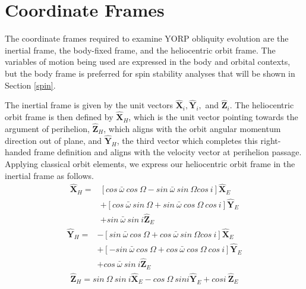 \documentclass[12pt,notitlepage]{article}
\begin{document}
\section{Coordinate Frames}\label{coord}

The coordinate frames required to examine YORP obliquity evolution are the inertial frame, the body-fixed frame, and the heliocentric orbit frame. The variables of motion being used are expressed in the body and orbital contexts, but the body frame is preferred for spin stability analyses that will be shown in Section \ref{spin}. 

The inertial frame is given by the unit vectors $\mathbf{\hat{X}}_i, \mathbf{\hat{Y}}_i,$ and $\mathbf{\hat{Z}}_i$. The heliocentric orbit frame is then defined by $\mathbf{\hat{X}}_H$, which is the unit vector pointing towards the argument of perihelion, $\mathbf{\hat{Z}}_H$, which aligns with the orbit angular momentum direction out of plane, and $\mathbf{\hat{Y}}_H$, the third vector which completes this right-handed frame definition and aligns with the velocity vector at perihelion passage.
Applying classical orbit elements, we express our heliocentric orbit frame in the inertial frame as follows.
\begin{equation}
\begin{split}
\mathbf{\hat{X}}_H = &[cos \: \bar{\omega} \:cos\:\Omega - sin \:\bar{\omega}\:sin\:\Omega cos \:i] \mathbf{\hat{X}}_E \\
& + [cos\:\bar{\omega}\:sin\:\Omega + sin\:\bar{\omega}\:cos\:\Omega \:cos\: i] \mathbf{\hat{Y}}_E \\
& + sin\: \bar{\omega} \:sin \:i \mathbf{\hat{Z}}_E
\end{split}
\end{equation}
\begin{equation}
\begin{split}
\mathbf{\hat{Y}}_H = &-[sin \: \bar{\omega} \:cos\:\Omega + cos \:\bar{\omega}\:sin\:\Omega cos \:i] \mathbf{\hat{X}}_E \\
& + [-sin\:\bar{\omega}\:cos\:\Omega + cos\:\bar{\omega}\:cos\:\Omega \:cos\: i] \mathbf{\hat{Y}}_E \\
& + cos\: \bar{\omega} \:sin \:i \mathbf{\hat{Z}}_E
\end{split}
\end{equation}
\begin{equation}
\begin{split}
\mathbf{\hat{Z}}_H = sin \: \Omega \: sin\: i \mathbf{\hat{X}}_E - cos \: \Omega\: sin i \mathbf{\hat{Y}}_E + cos i \:\mathbf{\hat{Z}}_E
\end{split}
\end{equation}
\end{document}
